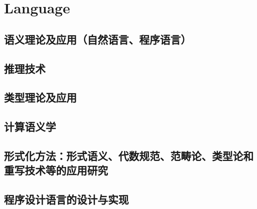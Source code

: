 

\chapter{Language}

\section{语义理论及应用（自然语言、程序语言）}
\section{推理技术}
\section{类型理论及应用}
\section{计算语义学}

\section{形式化方法：形式语义、代数规范、范畴论、类型论和重写技术等的应用研究}

\section{程序设计语言的设计与实现}


